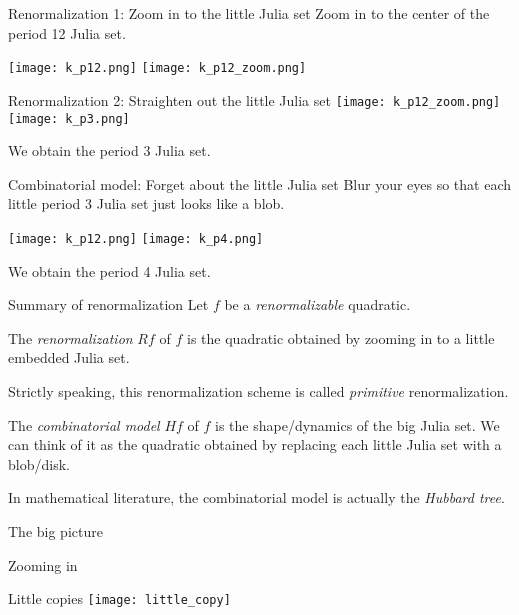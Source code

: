 \documentclass{beamer}
\begin{document}
\begin{frame}{Renormalization 1: Zoom in to the little Julia set}
\centering
Zoom in to the center of the period 12 Julia set.

\texttt{[image: k\_p12.png]}
\texttt{[image: k\_p12\_zoom.png]}
\end{frame}

\begin{frame}{Renormalization 2: Straighten out the little Julia set}
\centering
\texttt{[image: k\_p12\_zoom.png]}
\texttt{[image: k\_p3.png]}

We obtain the period 3 Julia set.
\end{frame}

\begin{frame}{Combinatorial model: Forget about the little Julia set}
\centering
Blur your eyes so that each little period 3 Julia set just looks like a blob.

\texttt{[image: k\_p12.png]}
\texttt{[image: k\_p4.png]}

We obtain the period 4 Julia set.
\end{frame}

\begin{frame}{Summary of renormalization}
Let $f$ be a \emph{renormalizable} quadratic.
\begin{definition}
The \emph{renormalization} $Rf$ of $f$ is the quadratic obtained by zooming in to a little embedded Julia set.
\end{definition}
Strictly speaking, this renormalization scheme is called \emph{primitive} renormalization.
\begin{definition}
The \emph{combinatorial model} $Hf$ of $f$ is the shape/dynamics of the big Julia set. We can think of it as the quadratic obtained by replacing each little Julia set with a blob/disk.
\end{definition}
In mathematical literature, the combinatorial model is actually the \emph{Hubbard tree}.
\end{frame}

\begin{frame}{The big picture}

\end{frame}

\begin{frame}{Zooming in}

\end{frame}

\begin{frame}{Little copies}
\centering
\texttt{[image: little\_copy]}
\end{frame}
\end{document}
